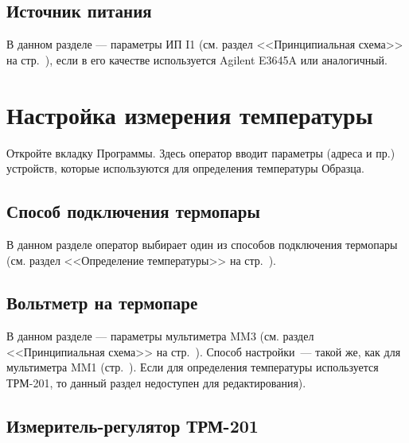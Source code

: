 \documentclass[12pt, a4paper, twocolumn]{report}
\begin{document}

\subsection{Источник питания}

В данном разделе --- параметры ИП I1 (см. раздел <<Принципиальная схема>> на стр.~\pageref{sec_schematic_diagram}), если в его качестве используется Agilent E3645A или аналогичный.




\section{Настройка измерения температуры}

Откройте вкладку  Программы. Здесь оператор вводит параметры (адреса и пр.) устройств, которые используются для определения температуры Образца.

\subsection{Способ подключения термопары}

В данном разделе оператор выбирает один из способов подключения термопары (см. раздел <<Определение температуры>> на стр.~\pageref{sec_t_measures}).

\subsection{Вольтметр на термопаре}

В данном разделе --- параметры мультиметра MM3 (см. раздел <<Принципиальная схема>> на стр.~\pageref{sec_schematic_diagram}). Способ настройки~--- такой же, как для мультиметра MM1 (стр.~\pageref{sec_mm1_config}). Если для определения температуры используется ТРМ-201, то данный раздел недоступен для редактирования).

\subsection{Измеритель-регулятор ТРМ-201}
\end{document}
